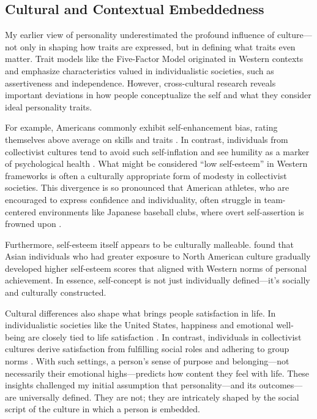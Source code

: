 \documentclass[stu]{apa7}
\begin{document}
\subsection{Cultural and Contextual Embeddedness}

My earlier view of personality underestimated the profound influence of culture—not only in shaping how traits are expressed, but in defining what traits even matter. Trait models like the Five-Factor Model originated in Western contexts and emphasize characteristics valued in individualistic societies, such as assertiveness and independence. However, cross-cultural research reveals important deviations in how people conceptualize the self and what they consider ideal personality traits.

For example, Americans commonly exhibit self-enhancement bias, rating themselves above average on skills and traits \parencite{taylor1989positive}. In contrast, individuals from collectivist cultures tend to avoid such self-inflation and see humility as a marker of psychological health \parencite{heine2007self}. What might be considered “low self-esteem” in Western frameworks is often a culturally appropriate form of modesty in collectivist societies. This divergence is so pronounced that American athletes, who are encouraged to express confidence and individuality, often struggle in team-centered environments like Japanese baseball clubs, where overt self-assertion is frowned upon \parencite{whiting1989you}.

Furthermore, self-esteem itself appears to be culturally malleable. \textcite{heine1999is} found that Asian individuals who had greater exposure to North American culture gradually developed higher self-esteem scores that aligned with Western norms of personal achievement. In essence, self-concept is not just individually defined—it’s socially and culturally constructed.

Cultural differences also shape what brings people satisfaction in life. In individualistic societies like the United States, happiness and emotional well-being are closely tied to life satisfaction \parencite{diener1995cross}. In contrast, individuals in collectivist cultures derive satisfaction from fulfilling social roles and adhering to group norms
\parencite{oishi2007dynamics,steger2008meaningful}. With such settings, a person’s sense of purpose and belonging—not necessarily their emotional highs—predicts how content they feel with life. These insights challenged my initial assumption that personality—and its outcomes—are universally defined. They are not; they are intricately shaped by the social script of the culture in which a person is embedded.
\end{document}
